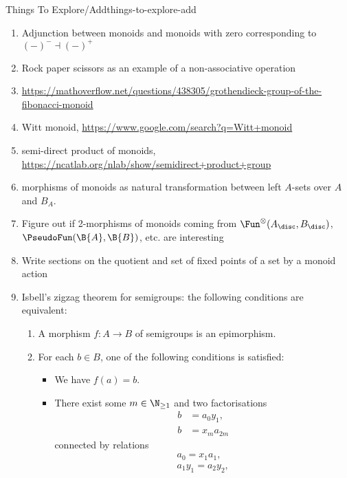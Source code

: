 \begin{remark}{Things To Explore/Add}{things-to-explore-add}
\begin{enumerate}
            Explore if we can define field spectra with an approach like this
        \item Adjunction between monoids and monoids with zero corresponding to $(-)^{-}\dashv(-)^{+}$
        \item Rock paper scissors as an example of a non-associative operation
        \item \url{https://mathoverflow.net/questions/438305/grothendieck-group-of-the-fibonacci-monoid}
        \item Witt monoid, \url{https://www.google.com/search?q=Witt+monoid}
        \item semi-direct product of monoids, \url{https://ncatlab.org/nlab/show/semidirect+product+group}
        \item morphisms of monoids as natural transformation between left $A$-sets over $A$ and $B_{A}$.
        \item Figure out if 2-morphisms of monoids coming from $\Fun^{\otimes}(A_{\disc},B_{\disc})$, $\PseudoFun(\B{A},\B{B})$, etc. are interesting
        \item Write sections on the quotient and set of fixed points of a set by a monoid action
        \item Isbell's zigzag theorem for semigroups: the following conditions are equivalent:
            \begin{enumerate}
                \item A morphism $f\colon A\to B$ of semigroups is an epimorphism.
                \item For each $b\in B$, one of the following conditions is satisfied:
                    \begin{itemize}
                        \item We have $f(a)=b$.
                        \item There exist some $m\in\N_{\geq1}$ and two factorisations
                            \begin{align*}
                                b &= a_{0}y_{1},\\
                                b &= x_{m}a_{2m}
                            \end{align*}
                            connected by relations
                            \begin{align*}
                                a_{0}         = x_{1}a_{1},\\
                                a_{1}y_{1}    = a_{2}y_{2},\\

\end{align*}
\end{itemize}
\end{enumerate}
\end{enumerate}
\end{remark}
